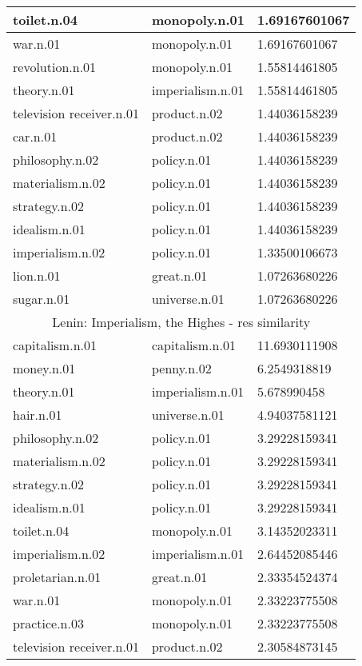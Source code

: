 \begin{center}
\begin{tabular}{ | l | l | l |}
toilet.n.04 & monopoly.n.01 & 1.69167601067\\ \hline
war.n.01 & monopoly.n.01 & 1.69167601067\\ \hline
revolution.n.01 & monopoly.n.01 & 1.55814461805\\ \hline
theory.n.01 & imperialism.n.01 & 1.55814461805\\ \hline
television receiver.n.01 & product.n.02 & 1.44036158239\\ \hline
car.n.01 & product.n.02 & 1.44036158239\\ \hline
philosophy.n.02 & policy.n.01 & 1.44036158239\\ \hline
materialism.n.02 & policy.n.01 & 1.44036158239\\ \hline
strategy.n.02 & policy.n.01 & 1.44036158239\\ \hline
idealism.n.01 & policy.n.01 & 1.44036158239\\ \hline
imperialism.n.02 & policy.n.01 & 1.33500106673\\ \hline
lion.n.01 & great.n.01 & 1.07263680226\\ \hline
sugar.n.01 & universe.n.01 & 1.07263680226\\ \hline
\multicolumn{3}{|c|}{Lenin: Imperialism, the Highes - res similarity} \\ \hline
capitalism.n.01 & capitalism.n.01 & 11.6930111908\\ \hline
money.n.01 & penny.n.02 & 6.2549318819\\ \hline
theory.n.01 & imperialism.n.01 & 5.678990458\\ \hline
hair.n.01 & universe.n.01 & 4.94037581121\\ \hline
philosophy.n.02 & policy.n.01 & 3.29228159341\\ \hline
materialism.n.02 & policy.n.01 & 3.29228159341\\ \hline
strategy.n.02 & policy.n.01 & 3.29228159341\\ \hline
idealism.n.01 & policy.n.01 & 3.29228159341\\ \hline
toilet.n.04 & monopoly.n.01 & 3.14352023311\\ \hline
imperialism.n.02 & imperialism.n.01 & 2.64452085446\\ \hline
proletarian.n.01 & great.n.01 & 2.33354524374\\ \hline
war.n.01 & monopoly.n.01 & 2.33223775508\\ \hline
practice.n.03 & monopoly.n.01 & 2.33223775508\\ \hline
television receiver.n.01 & product.n.02 & 2.30584873145\\ \hline

\end{tabular}
\end{center}

